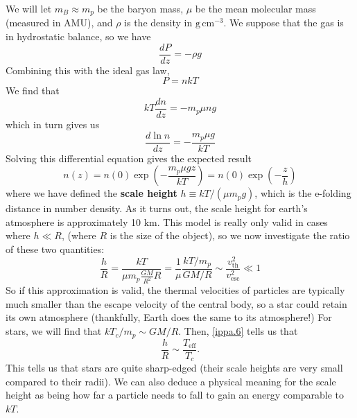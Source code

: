 \documentclass[10pt]{article}
\numberwithin{equation}{section}
\newcommand{\n}{\noindent}
\begin{document}
	 \n We will let $m_B\approx m_p$ be the baryon mass, $\mu$ be the mean 
molecular mass (measured in AMU), and $\rho$ is the density in $\mathrm{g
\,cm^{-3}}$. We suppose that the gas is in hydrostatic balance, so we have
	 \begin{equation}
	 	\label{ippa.1} \frac{dP}{dz}=-\rho g
	 \end{equation}
	 Combining this with the ideal gas law,
	 \begin{equation}
	 	\label{ippa.2} P=nkT
	 \end{equation}
	We find that
	\begin{equation}
		\label{ippa.3} kT\frac{dn}{dz}=-m_p\mu ng
	\end{equation}
	which in turn gives us
	\begin{equation}
		\label{ippa.4} \frac{d\ln n}{dz}=-\frac{m_p\mu g}{kT}
	\end{equation}
	Solving this differential equation gives the expected result
	\begin{equation}
		\label{ippa.5} n(z)=n(0)\exp\left(-\frac{m_p\mu gz}{kT}\right)=n
(0)\exp\left(-\frac{z}{h}\right)
	\end{equation}
	where we have defined the \textbf{scale height} $h\equiv kT/(\mu m_pg)
$, which is the e-folding distance in number density. As it turns out, the 
scale height for earth's atmosphere is approximately 10 km. This model is 
really only valid in cases where $h\ll R$, (where $R$ is the size of the 
object), so we now investigate the ratio of these two quantities:
	\begin{equation}
		\label{ippa.6} \frac{h}{R}=\frac{kT}{\mu m_p\frac{GM}{R^2}R}=\frac
{1}{\mu}\frac{kT/m_p}{GM/R}\sim \frac{v_{\mathrm{th}}^2}{v_{\mathrm{esc}}
^2}\ll 1
	\end{equation}
	So if this approximation is valid, the thermal velocities of particles 
are typically much smaller than the escape velocity of the central body, so 
a star could retain its own atmosphere (thankfully, Earth does the same to 
its atmosphere!) For stars, we will find that $kT_c/m_p\sim GM/R$. Then, 
\eqref{ippa.6} tells us that
	\begin{equation}
		\label{ippa.7} \frac{h}{R}\sim \frac{T_{\mathrm{eff}}}{T_c}.
	\end{equation}
	This tells us that stars are quite sharp-edged (their scale heights are 
very small compared to their radii). We can also deduce a physical meaning 
for the scale height as being how far a particle needs to fall to gain an 
energy comparable to $kT$.\\
	
\end{document}
